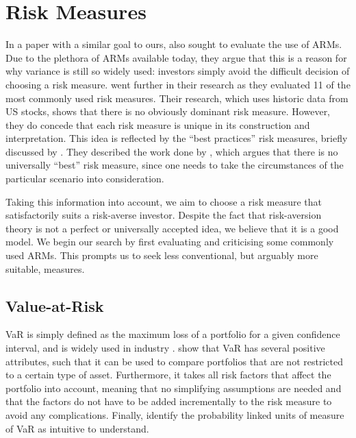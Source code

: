 \documentclass[12pt,a4paper]{article}
\begin{document}
\section{Risk Measures}
\label{sec:Risk}

In a paper with a similar goal to ours, \cite{byrne2004different} also sought to evaluate the use of ARMs. Due to the plethora of ARMs available today, they argue that this is a reason for why variance is still so widely used: investors simply avoid the difficult decision of choosing a risk measure. \cite{righi2017simulation} went further in their research as they evaluated 11 of the most commonly used risk measures. Their research, which uses historic data from US stocks, shows that there is no obviously dominant risk measure. However, they do concede that each risk measure is unique in its construction and interpretation. This idea is reflected by the ``best practices'' risk measures, briefly discussed by \cite{dowd2006after}. They described the work done by \cite{dhaene2003economic}, which argues that there is no universally ``best'' risk measure, since one needs to take the circumstances of the particular scenario into consideration.

Taking this information into account, we aim to choose a risk measure that satisfactorily suits a risk-averse investor. Despite the fact that risk-aversion theory is not a perfect or universally accepted idea, we believe that it is a good model. We begin our search by first evaluating and criticising some commonly used ARMs. This prompts us to seek less conventional, but arguably more suitable, measures.

\subsection{Value-at-Risk}
\label{subsec:VaR}

VaR is simply defined as the maximum loss  of a portfolio for a given confidence interval, and is widely used in industry \citep{consiglirisk}. \cite{dowd2006after} show that VaR has several positive attributes, such that it can be used to compare portfolios that are not restricted to a certain type of asset. Furthermore, it takes all risk factors that affect the portfolio into account, meaning that no simplifying assumptions are needed and that the factors do not have to be added incrementally to the risk measure to avoid any complications. Finally, \cite{dowd2006after} identify the probability linked units of measure of VaR as intuitive to understand.
\end{document}
